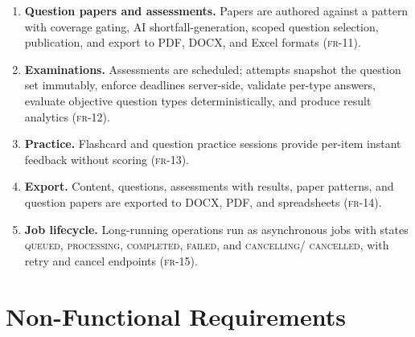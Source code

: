 \begin{enumerate}
        question-type attempt rules are validated, approved, locked, and
        extractable from text, PDF, and image sources (\textsc{fr-10}).
  \item \textbf{Question papers and assessments.} Papers are authored against
        a pattern with coverage gating, AI shortfall-generation, scoped
        question selection, publication, and export to PDF, DOCX, and Excel
        formats (\textsc{fr-11}).
  \item \textbf{Examinations.} Assessments are scheduled; attempts snapshot
        the question set immutably, enforce deadlines server-side, validate
        per-type answers, evaluate objective question types deterministically,
        and produce result analytics (\textsc{fr-12}).
  \item \textbf{Practice.} Flashcard and question practice sessions provide
        per-item instant feedback without scoring (\textsc{fr-13}).
  \item \textbf{Export.} Content, questions, assessments with results, paper
        patterns, and question papers are exported to DOCX, PDF, and spreadsheets
        (\textsc{fr-14}).
  \item \textbf{Job lifecycle.} Long-running operations run as asynchronous
        jobs with states \textsc{queued}, \textsc{processing},
        \textsc{completed}, \textsc{failed}, and \textsc{cancelling}/
        \textsc{cancelled}, with retry and cancel endpoints (\textsc{fr-15}).
\end{enumerate}

\section{Non-Functional Requirements}

